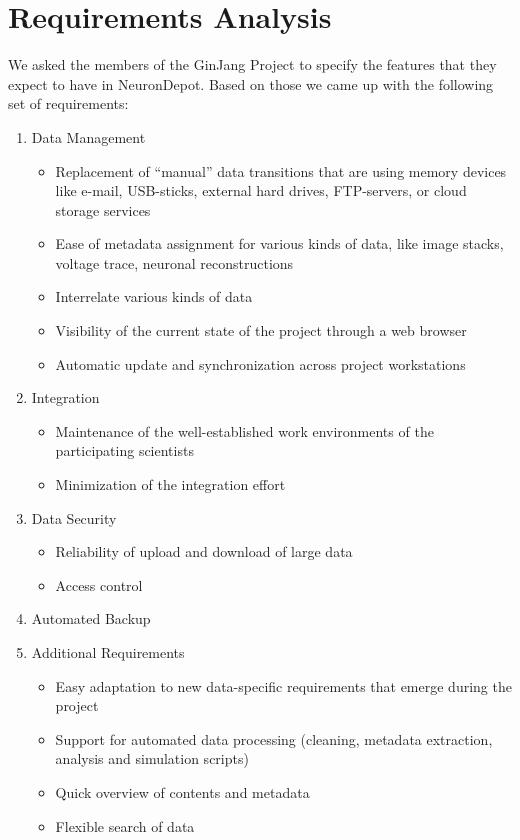 \documentclass{frontiersSCNS} %
\begin{document}
\section{Requirements Analysis}
We asked the members of the GinJang Project to specify the features that they
expect to have in NeuronDepot. Based on those we came up with the following set
of requirements:
\begin{enumerate}
\item Data Management
    \begin{itemize}
    \item Replacement of ``manual'' data transitions that are using memory
        devices like e-mail, USB-sticks, external hard drives, FTP-servers, or
        cloud storage services
    \item Ease of metadata assignment for various kinds of data, like image
        stacks, voltage trace, neuronal reconstructions
    \item Interrelate various kinds of data
    \item Visibility of the current state of the project through a web browser
    \item Automatic update and synchronization across project workstations
    \end{itemize}
\item Integration
    \begin{itemize}
    \item Maintenance of the well-established work environments of the participating scientists
    \item Minimization of the integration effort
    \end{itemize}
\item Data Security
    \begin{itemize}
    \item Reliability of upload and download of large data
    \item Access control
    \end{itemize}
\item Automated Backup
\item Additional Requirements
    \begin{itemize}
    \item Easy adaptation to new data-specific requirements that emerge during
        the project
    \item Support for automated data processing (cleaning, metadata extraction,
    analysis and simulation scripts)
    \item Quick overview of contents and metadata
    \item Flexible search of data
    \end{itemize}
\end{enumerate}
\end{document}

